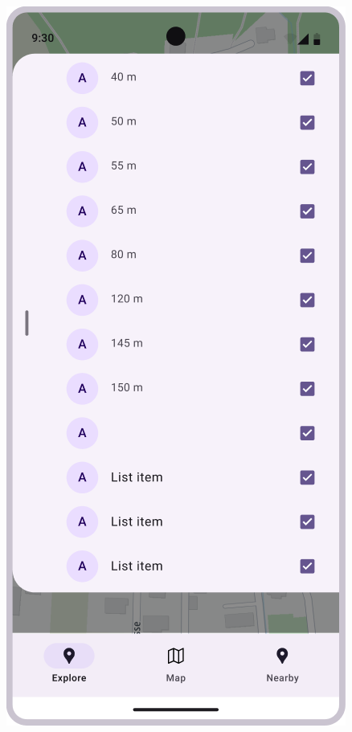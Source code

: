 \begin{figure}[H]
    \centering
    \begin{minipage}{0.3\textwidth}
        \centering
        \includegraphics[width=\textwidth]{images/paul/wireframes/listScreenv1.png}

\end{minipage}
\end{figure}
